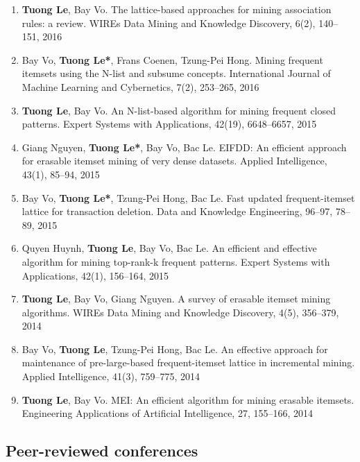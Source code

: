 \documentclass[letterpaper]{article}
\begin{document}
\begin{enumerate}
\item \textbf{Tuong Le}, Bay Vo. The lattice-based approaches for mining association rules: a review. WIREs Data Mining and Knowledge Discovery, 6(2), 140--151, 2016

\item Bay Vo, \textbf{Tuong Le*}, Frans Coenen, Tzung-Pei Hong. Mining frequent itemsets using the N-list and subsume concepts. International Journal of Machine Learning and Cybernetics, 7(2), 253--265, 2016

\item \textbf{Tuong Le}, Bay Vo. An N-list-based algorithm for mining frequent closed patterns. Expert Systems with Applications, 42(19), 6648--6657, 2015

\item Giang Nguyen, \textbf{Tuong Le*}, Bay Vo, Bac Le. EIFDD: An efficient approach for erasable itemset mining of very dense datasets. Applied Intelligence, 43(1), 85--94, 2015 

\item Bay Vo, \textbf{Tuong Le*}, Tzung-Pei Hong, Bac Le. Fast updated frequent-itemset lattice for transaction deletion. Data and Knowledge Engineering, 96–97, 78--89, 2015 

\item Quyen Huynh, \textbf{Tuong Le}, Bay Vo, Bac Le. An efficient and effective algorithm for mining top-rank-k frequent patterns. Expert Systems with Applications, 42(1), 156--164, 2015

\item \textbf{Tuong Le}, Bay Vo, Giang Nguyen. A survey of erasable itemset mining algorithms. WIREs Data Mining and Knowledge Discovery, 4(5), 356--379, 2014

\item Bay Vo, \textbf{Tuong Le}, Tzung-Pei Hong, Bac Le. An effective approach for maintenance of pre-large-based frequent-itemset lattice in incremental mining. Applied Intelligence, 41(3), 759--775, 2014

\item \textbf{Tuong Le}, Bay Vo. MEI: An efficient algorithm for mining erasable itemsets. Engineering Applications of Artificial Intelligence, 27, 155--166, 2014

\end{enumerate}

\subsection*{Peer-reviewed conferences}
\end{document}

